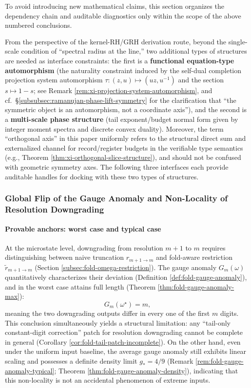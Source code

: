 To avoid introducing new mathematical claims, this section organizes the dependency chain and auditable diagnostics only within the scope of the above numbered conclusions.
\par
From the perspective of the kernel-RH/GRH derivation route, beyond the single-scale condition of ``spectral radius at the line,'' two additional types of structures are needed as interface constraints: the first is a \textbf{functional equation-type automorphism} (the naturality constraint induced by the self-dual completion projection system automorphism \(\tau:(z,u)\mapsto(uz,u^{-1})\) and the section \(s\mapsto 1-s\); see Remark \ref{rem:xi-projection-system-automorphism}, and cf.\ \S\ref{subsubsec:ramanujan-phase-lift-symmetry} for the clarification that ``the symmetric object is an automorphism, not a coordinate axis''), and the second is a \textbf{multi-scale phase structure} (tail exponent/budget normal form given by integer moment spectra and discrete convex duality). Moreover, the term ``orthogonal axis'' in this paper uniformly refers to the structural direct sum and externalized channel for record/register budgets in the verifiable type semantics (e.g., Theorem \ref{thm:xi-orthogonal-slice-structure}), and should not be confused with geometric symmetry axes. The following three interfaces each provide auditable handles for docking with these two types of structures.

\subsubsection{Global Flip of the Gauge Anomaly and Non-Locality of Resolution Downgrading}\label{subsubsec:insight-gauge-anomaly}
\paragraph{Provable anchors: worst case and typical case}
At the microstate level, downgrading from resolution \(m+1\) to \(m\) requires distinguishing between naive truncation \(r_{m+1\to m}\) and fold-aware restriction \(\widetilde r_{m+1\to m}\) (Section \ref{subsec:fold-omega-restriction}). The gauge anomaly \(G_m(\omega)\) quantitatively characterizes their deviation (Definition \ref{def:fold-gauge-anomaly}), and in the worst case attains full length (Theorem \ref{thm:fold-gauge-anomaly-max}):
\[
G_m(\omega^\star)=m,
\]
meaning the two downgrading outputs differ in every one of the first \(m\) digits. This conclusion simultaneously yields a structural limitation: any ``tail-only constant-digit correction'' patch for resolution downgrading cannot be complete in general (Corollary \ref{cor:fold-tail-patch-incomplete}).
On the other hand, even under the uniform input baseline, the average gauge anomaly still exhibits linear scaling and possesses a definite density limit \(g_\ast=4/9\) (Remark \ref{rem:fold-gauge-anomaly-typical}; Theorem \ref{thm:fold-gauge-anomaly-density}), indicating that this non-locality is not an accidental phenomenon of extreme inputs.

